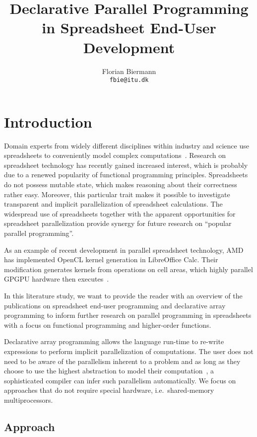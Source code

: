 \documentclass[a4paper]{article}
\title{Declarative Parallel Programming in Spreadsheet End-User
  Development}
\author{Florian Biermann\\\small{\texttt{fbie@itu.dk}}}
\begin{document}
\maketitle

\section{Introduction}
\label{sec:intro}

Domain experts from widely different disciplines within industry and science use spreadsheets to conveniently model complex computations~\cite{Sestoft2014Spreadsheet}. Research on spreadsheet technology has recently gained increased interest, which is probably due to a renewed popularity of functional programming principles. Spreadsheets do not possess mutable state, which makes reasoning about their correctness rather easy. Moreover, this particular trait makes it possible to investigate transparent and implicit parallelization of spreadsheet calculations. The widespread use of spreadsheets together with the apparent opportunities for spreadsheet parallelization provide synergy for future research on ``popular parallel programming''.

As an example of recent development in parallel spreadsheet technology, AMD has implemented OpenCL kernel generation in LibreOffice Calc. Their modification generates kernels from operations on cell areas, which highly parallel GPGPU hardware then executes~\cite{Trudeau2015Collaboration}.

In this literature study, we want to provide the reader with an overview of the publications on spreadsheet end-user programming and declarative array programming to inform further research on parallel programming in spreadsheets with a focus on functional programming and higher-order functions.

Declarative array programming allows the language run-time to re-write expressions to perform implicit parallelization of computations. The user does not need to be aware of the parallelism inherent to a problem and as long as they choose to use the highest abstraction to model their computation~\cite{Bernecky:2015:AEP:2774959.2774962}, a sophisticated compiler can infer such parallelism automatically. We focus on approaches that do not require special hardware, i.e.\ shared-memory multiprocessors.

\subsection{Approach}
\label{sec:approach}
\end{document}
